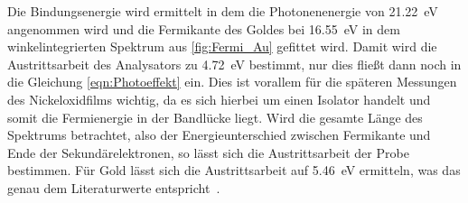         Die Bindungsenergie wird ermittelt in dem die Photonenenergie von \SI{21.22}{\electronvolt} angenommen wird und die Fermikante des Goldes bei \SI{16.55}{\electronvolt} in dem winkelintegrierten Spektrum aus \autoref{fig:Fermi_Au} gefittet wird.
        Damit wird die Austrittsarbeit des Analysators zu \SI{4.72}{\electronvolt} bestimmt, nur dies fließt dann noch in die Gleichung \ref{eqn:Photoeffekt} ein.
        Dies ist vorallem für die späteren Messungen des Nickeloxidfilms wichtig, da es sich hierbei um einen Isolator handelt und somit die Fermienergie in der Bandlücke liegt.
        Wird die gesamte Länge des Spektrums betrachtet, also der Energieunterschied zwischen Fermikante und Ende der Sekundärelektronen, so lässt sich die Austrittsarbeit der Probe bestimmen.
        Für Gold lässt sich die Austrittsarbeit auf \SI{5.46}{\electronvolt} ermitteln, was das genau dem Literaturwerte entspricht~\cite{5A_4}.
   
